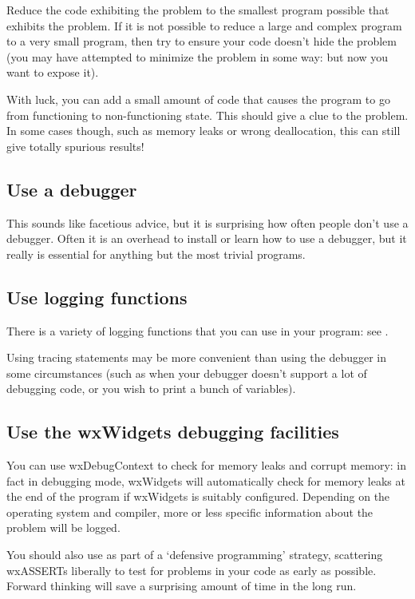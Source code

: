 Reduce the code exhibiting the problem to the smallest program possible
that exhibits the problem. If it is not possible to reduce a large and
complex program to a very small program, then try to ensure your code
doesn't hide the problem (you may have attempted to minimize the problem
in some way: but now you want to expose it).

With luck, you can add a small amount of code that causes the program
to go from functioning to non-functioning state. This should give a clue
to the problem. In some cases though, such as memory leaks or wrong
deallocation, this can still give totally spurious results!

\subsection{Use a debugger}

This sounds like facetious advice, but it is surprising how often people
don't use a debugger. Often it is an overhead to install or learn how to
use a debugger, but it really is essential for anything but the most
trivial programs.

\subsection{Use logging functions}

There is a variety of logging functions that you can use in your program:
see .

Using tracing statements may be more convenient than using the debugger
in some circumstances (such as when your debugger doesn't support a lot
of debugging code, or you wish to print a bunch of variables).

\subsection{Use the wxWidgets debugging facilities}

You can use wxDebugContext to check for
memory leaks and corrupt memory: in fact in debugging mode, wxWidgets will
automatically check for memory leaks at the end of the program if wxWidgets is suitably
configured. Depending on the operating system and compiler, more or less
specific information about the problem will be logged.

You should also use  as part of a `defensive programming' strategy,
scattering wxASSERTs liberally to test for problems in your code as early as possible. Forward thinking
will save a surprising amount of time in the long run.

